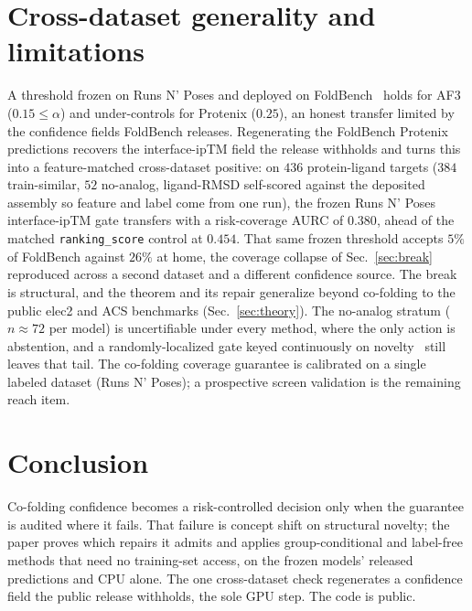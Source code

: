 \documentclass[10pt]{article}
\begin{document}
\section{Cross-dataset generality and limitations}
A threshold frozen on Runs N' Poses and deployed on FoldBench~\citep{foldbench} holds for AF3
($0.15\le\alpha$) and under-controls for Protenix ($0.25$), an honest transfer limited by the
confidence fields FoldBench releases. Regenerating the FoldBench Protenix predictions recovers the
interface-ipTM field the release withholds and turns this into a feature-matched cross-dataset
positive: on $436$ protein-ligand targets ($384$ train-similar, $52$ no-analog, ligand-RMSD
self-scored against the deposited assembly so feature and label come from one run), the frozen
Runs N' Poses interface-ipTM gate transfers with a risk-coverage AURC of $0.380$, ahead of the
matched \texttt{ranking\_score} control at $0.454$. That same frozen threshold accepts $5\%$ of
FoldBench against $26\%$ at home, the coverage collapse of Sec.~\ref{sec:break} reproduced across
a second dataset and a different confidence source. The break is structural, and the theorem and its
repair generalize beyond co-folding to the public elec2 and ACS benchmarks (Sec.~\ref{sec:theory}).
The no-analog stratum ($n\!\approx\!72$ per model) is uncertifiable under every method, where the only
action is abstention, and a randomly-localized gate keyed continuously on
novelty~\citep{hore2024rlcp} still leaves that tail. The co-folding coverage guarantee is calibrated
on a single labeled dataset (Runs N' Poses); a prospective screen validation is the remaining reach
item.

\section{Conclusion}
Co-folding confidence becomes a risk-controlled decision only when the guarantee is audited where it
fails. That failure is concept shift on structural novelty; the paper proves which repairs it admits
and applies group-conditional and label-free methods that need no training-set access, on the
frozen models' released predictions and CPU alone. The one cross-dataset check regenerates a
confidence field the public release withholds, the sole GPU step. The code is public.
\end{document}
